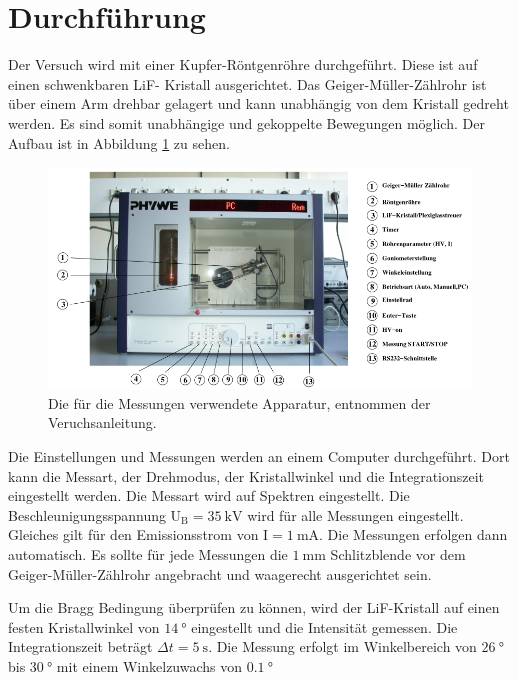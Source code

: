 \section{Durchführung}
\label{sec:Durchführung}

Der Versuch wird mit einer Kupfer-Röntgenröhre durchgeführt.
Diese ist auf einen schwenkbaren LiF- Kristall ausgerichtet.
Das Geiger-Müller-Zählrohr ist über einem Arm drehbar gelagert und kann unabhängig von dem Kristall gedreht werden.
Es sind somit unabhängige und gekoppelte Bewegungen möglich.
Der Aufbau ist in Abbildung \ref{fig:Aufbau} zu sehen.

\begin{figure}
  \centering
  \includegraphics[width=\textwidth]{images/Aufbau.png}
  \caption{Die für die Messungen verwendete Apparatur, entnommen der Veruchsanleitung\cite[4]{sample}.}
  \label{fig:Aufbau}
\end{figure}

Die Einstellungen und Messungen werden an einem Computer durchgeführt.
Dort kann die Messart, der Drehmodus, der Kristallwinkel und die Integrationszeit eingestellt werden.
Die Messart wird auf Spektren eingestellt.
Die Beschleunigungsspannung U$_{\text{B}} = \SI{35}{\kilo\volt}$ wird für alle Messungen eingestellt.
Gleiches gilt für den Emissionsstrom von I$ = \SI{1}{\milli\ampere}$.
Die Messungen erfolgen dann automatisch.
Es sollte für jede Messungen die $\SI{1}{\milli\metre}$ Schlitzblende vor dem Geiger-Müller-Zählrohr angebracht und waagerecht ausgerichtet sein.

Um die Bragg Bedingung überprüfen zu können, wird der LiF-Kristall auf einen festen Kristallwinkel von $\SI{14}{\degree}$ eingestellt und die Intensität gemessen.
Die Integrationszeit beträgt $\Delta t = \SI{5}{\second}$.
Die Messung erfolgt im Winkelbereich von $\SI{26}{\degree}$ bis $\SI{30}{\degree}$ mit einem Winkelzuwachs von $\SI{0.1}{\degree}$

